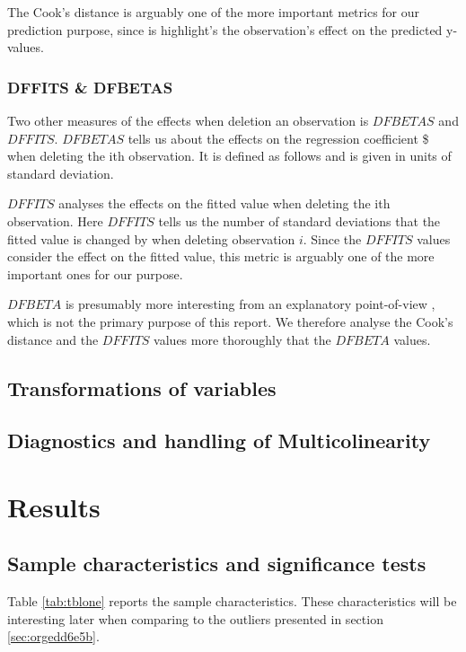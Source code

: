 \documentclass[11pt]{article}
\begin{document}
The Cook's distance is arguably one of the more important metrics for our prediction purpose, since is highlight's
the observation's effect on the predicted y-values. \cite{22286}

\subsubsection{DFFITS \& DFBETAS}
\label{sec:org60e1f74}

Two other measures of the effects when deletion an observation is \(DFBETAS\) and \(DFFITS\). \(DFBETAS\) tells us
about the effects on the regression coefficient \$ when deleting the ith observation. It is defined as
follows and is given in units of standard deviation.

\(DFFITS\) analyses the effects on the fitted value when deleting the ith observation. Here \(DFFITS\) tells us
the number of standard deviations that the fitted value is changed by when deleting observation \(i\). Since 
the \(DFFITS\) values consider the effect on the fitted value, this metric is arguably one of the more important 
ones for our purpose.

\(DFBETA\) is presumably more interesting from an explanatory point-of-view \cite{22286}, which is not the
primary purpose of this report. We therefore analyse the Cook's distance and the \(DFFITS\) values more
thoroughly that the \(DFBETA\) values.

\subsection{Transformations of variables}
\label{sec:orgcff8439}
\subsection{Diagnostics and handling of Multicolinearity}
\label{sec:org676c447}
\newpage
\section{Results}
\label{sec:org5189e23}
\subsection{Sample characteristics and significance tests}
\label{sec:orgc029e12}

Table \ref{tab:tblone} reports the sample characteristics. These characteristics will be interesting later
when comparing to the outliers presented in section \ref{sec:orgedd6e5b}.
\end{document}
